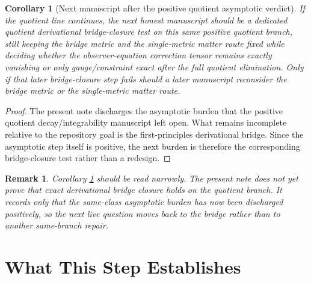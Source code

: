 \documentclass[11pt]{article}
\newtheorem{remark}{Remark}
\newtheorem{corollary}{Corollary}
\begin{document}
\begin{corollary}[Next manuscript after the positive quotient asymptotic verdict]
\label{cor:next}
If the quotient line continues, the next honest manuscript should be a dedicated quotient derivational bridge-closure test on this same positive quotient branch, still keeping the bridge metric and the single-metric matter route fixed while deciding whether the observer-equation correction tensor remains exactly vanishing or only gauge/constraint exact after the full quotient elimination. Only if that later bridge-closure step fails should a later manuscript reconsider the bridge metric or the single-metric matter route.
\end{corollary}

\begin{proof}
The present note discharges the asymptotic burden that the positive quotient
decay/integrability manuscript left open. What remains incomplete relative to
the repository goal is the first-principles derivational bridge. Since the
asymptotic step itself is positive, the next burden is therefore the
corresponding bridge-closure test rather than a redesign.
\end{proof}

\begin{remark}
Corollary \ref{cor:next} should be read narrowly. The present note does \emph{not} yet prove that exact derivational bridge closure holds on the quotient branch. It records only that the same-class asymptotic burden has now been discharged positively, so the next live question moves back to the bridge rather than to another same-branch repair.
\end{remark}

\section{What This Step Establishes}
\end{document}
